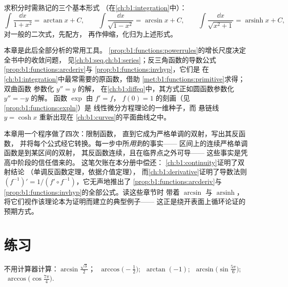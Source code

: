 \begin{method}[选取恰当的原函数形式]\label{met:b1:functions:primitive}
求积分时需熟记的三个基本形式
（在\cref{ch:b1:integration}中）：
\[
\int \frac{\dd x}{1 + x^2} = \arctan x + C,
\qquad
\int \frac{\dd x}{\sqrt{1 - x^2}} = \arcsin x + C,
\qquad
\int \frac{\dd x}{\sqrt{x^2 + 1}} = \operatorname{arsinh} x + C,
\]
对一般的二次式，先配方，
再作伸缩，化归为上述形式。
\end{method}

\begin{remark}[本章的用途]\label{rem:b1:functions:whereused}
本章是此后全部分析的常用工具。
\cref{prop:b1:functions:powerrules}的增长尺度决定
全书中的收敛问题，
见\cref{ch:b1:seq,ch:b1:series}；反三角函数的导数公式
\cref{prop:b1:functions:arcderiv}与
\cref{prop:b1:functions:invhyp}，它们是
在\cref{ch:b1:integration}中最常需要的原函数，借助
\cref{met:b1:functions:primitive}求得；双曲函数
参数化 $y'' = y$ 的解，
在\cref{ch:b1:diffeq}中，其方式正如圆函数参数化 $y'' = -y$ 的解。
函数 $\exp$ 由 $f' = f$，
$f(0) = 1$ 的刻画（见\cref{prop:b1:functions:expln}）是
线性微分方程理论的一维种子，而
悬链线 $y = \cosh x$ 重新出现在
\cref{ch:b1:curves}的平面曲线之中。
\end{remark}

\begin{remark}[插曲：反函数程序]\label{rem:b1:functions:interlude}
本章用一个程序做了四次：限制函数，
直到它成为严格单调的双射，写出其反函数，
并将每个公式经它转换。每一步中所\emph{用到}的事实——
区间上的连续严格单调函数是到某区间的双射，
其反函数连续，且在临界点之外可导——
这些事实是凭高中阶段的信任借来的。
这笔欠账在本分册中偿还：
\cref{ch:b1:continuity}证明了双射结论
（单调反函数定理，依据介值定理），
而\cref{ch:b1:derivative}证明了导数法则
$(f^{-1})' = 1/(f' \circ f^{-1})$，它无声地推出了
\cref{prop:b1:functions:arcderiv}与
\cref{prop:b1:functions:invhyp}的全部公式。读这些章节时
带着 $\arcsin$ 与 $\operatorname{arsinh}$，
将它们视作该理论本为证明而建立的典型例子——
这正是绕开表面上循环论证的预期方式。
\end{remark}

\section{练习}

\begin{exercise}[$\star$]\label{exo:b1:functions:1}
不用计算器计算：$\arcsin\frac{\sqrt 3}{2}$；
$\;\arccos\bigl(-\frac 12\bigr)$; $\;\arctan(-1)$;
$\;\arcsin\bigl(\sin\frac{5\pi}{6}\bigr)$;
$\;\arccos\bigl(\cos\frac{7\pi}{4}\bigr)$.
\end{exercise}


